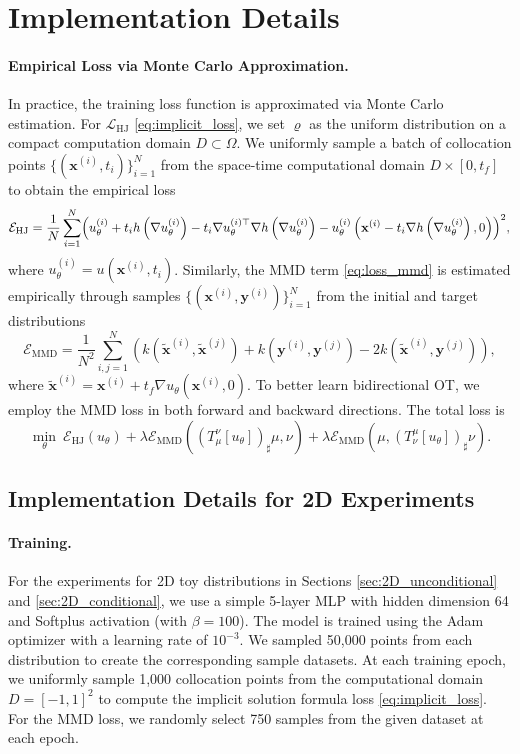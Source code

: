 \documentclass{article} %
\theoremstyle{plain}
\theoremstyle{definition}
\theoremstyle{remark}
\newcommand{\bx}{\mathbf{x}}
\newcommand{\by}{\mathbf{y}}
\newcommand{\LHJ}{\mathcal{L}_{\text{HJ}}}
\newcommand{\EMMD}{\mathcal{E}_{\text{MMD}}}
\newcommand{\EHJ}{\mathcal{E}_{\text{HJ}}}
\newcommand{\nb}{\nabla}
\newcommand{\wt}{\widetilde}
\newcommand{\parentheses}[1]{\left(#1\right)}
\begin{document}
\section{Implementation Details}\label{appen:implementation}
\paragraph{Empirical Loss via Monte Carlo Approximation.}
In practice, the training loss function is approximated via Monte Carlo estimation.
For $\LHJ$ \eqref{eq:implicit_loss}, we set $\varrho$ as the uniform distribution on a compact computation domain $D \subset \Omega.$ We uniformly sample a batch of collocation points $\{(\bx^{(i)},t_i)\}_{i=1}^N$ from the space-time computational domain $D \times [0, t_f]$ to obtain the empirical loss 
$$\EHJ=\dfrac{1}{N}\sum_{i=1}^N \Bigl(u^{(i)}_\theta + t_ih\left(\nabla u^{(i)}_\theta\right) - t_i\nabla u^{(i)\top}_\theta \nabla h\left(\nabla u^{(i)}_\theta\right) - u^{(i)}_\theta\left(\bx^{(i)}-t_i\nabla h\left(\nabla u^{(i)}_\theta\right),0\right)\Bigr)^2,$$
where $u^{(i)}_\theta = u(\bx^{(i)}, t_i)$. Similarly, the MMD term \eqref{eq:loss_mmd} is estimated empirically through samples $\{ (\bx^{(i)},\by^{(i)})\}_{i=1}^N$ from the initial and target distributions 
$$\EMMD = \dfrac{1}{N^2} \sum_{i,j=1}^N \parentheses{k(\wt{\bx}^{(i)}, \wt{\bx}^{(j)}) + k(\by^{(i)},\by^{(j)}) - 2 k(\wt{\bx}^{(i)}, \by^{(j)})},$$
where $\wt{\bx}^{(i)} = \bx^{(i)} + t_f \nb u_\theta(\bx^{(i)},0)$. To better learn bidirectional OT, we employ the MMD loss in both forward and backward directions. The total loss is
\begin{equation}
    \underset{\theta}{\min}\  \EHJ\left(u_\theta\right) + \lambda  \EMMD(\left(T_\mu^\nu\left[u_\theta\right]\right)_\sharp\mu, \nu) + \lambda  \EMMD(\mu, \left(T_\nu^\mu\left[u_\theta\right]\right)_\sharp\nu).
\end{equation}


\subsection{Implementation Details for 2D Experiments}\label{append:2D_details}
\paragraph{Training.}
For the experiments for 2D toy distributions in Sections \ref{sec:2D_unconditional} and \ref{sec:2D_conditional}, we use a simple 5-layer MLP with hidden dimension 64 and Softplus activation (with $\beta=100$). The model is trained using the Adam optimizer with a learning rate of $10^{-3}$. We sampled 50,000 points from each distribution to create the corresponding sample datasets.
At each training epoch, we uniformly sample 1,000 collocation points from the computational domain $D = [-1,1]^2$ to compute the implicit solution formula loss \eqref{eq:implicit_loss}. 
For the MMD loss, we randomly select 750 samples from the given dataset at each epoch. 
\end{document}
